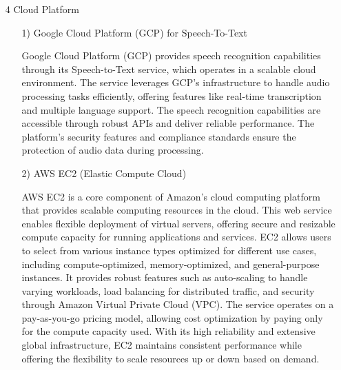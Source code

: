 \documentclass[conference]{IEEEtran}
\begin{document}
    \begin{enumerate}
    \item[4] Cloud Platform\par
    \vspace{0.3em}
    
    \begin{itemize}
        \item [1)] Google Cloud Platform (GCP) for Speech-To-Text\par
        \vspace{0.3em}
        Google Cloud Platform (GCP) provides speech recognition capabilities through its Speech-to-Text service, which operates in a scalable cloud environment. The service leverages GCP's infrastructure to handle audio processing tasks efficiently, offering features like real-time transcription and multiple language support. The speech recognition capabilities are accessible through robust APIs and deliver reliable performance. The platform's security features and compliance standards ensure the protection of audio data during processing.

        \vspace{1em}

        \item [2)] AWS EC2 (Elastic Compute Cloud)\par
        \vspace{0.3em}
        AWS EC2 is a core component of Amazon's cloud computing platform that provides scalable computing resources in the cloud. This web service enables flexible deployment of virtual servers, offering secure and resizable compute capacity for running applications and services. EC2 allows users to select from various instance types optimized for different use cases, including compute-optimized, memory-optimized, and general-purpose instances. It provides robust features such as auto-scaling to handle varying workloads, load balancing for distributed traffic, and security through Amazon Virtual Private Cloud (VPC). The service operates on a pay-as-you-go pricing model, allowing cost optimization by paying only for the compute capacity used. With its high reliability and extensive global infrastructure, EC2 maintains consistent performance while offering the flexibility to scale resources up or down based on demand.

        \vspace{1em}


\end{itemize}
\end{enumerate}
\end{document}
